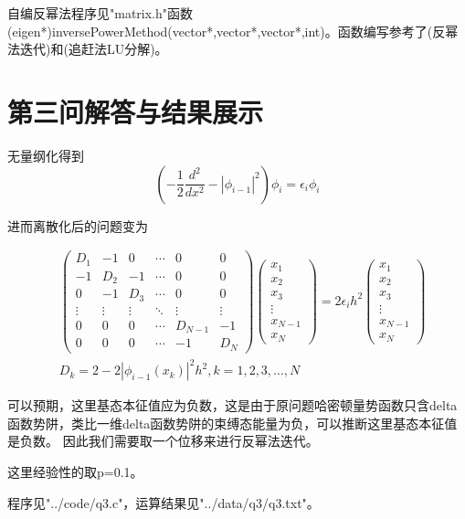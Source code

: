 \documentclass[10pt, a4paper]{article}
\begin{document}
    自编反幂法程序见"matrix.h"函数(eigen*)inversePowerMethod(vector*,vector*,vector*,int)。函数编写参考了\cite{ref1}(反幂法迭代)和\cite{ref2}(追赶法LU分解)。


    \section{第三问解答与结果展示}

    无量纲化得到
    \[(-\frac{1}{2}\frac{d^2}{dx^2}-|\phi_{i-1}|^2)\phi_i=\epsilon_i \phi_i\]

    进而离散化后的问题变为

    \begin{align*}
      &\begin{pmatrix}
        D_1&-1&0&\cdots&0&0\\
        -1& D_2&-1&\cdots&0&0\\
        0&-1&D_3&\cdots&0&0\\
        \vdots&\vdots&\vdots&\ddots&\vdots&\vdots\\
        0&0&0&\cdots& D_{N-1}&-1\\
        0&0&0&\cdots&-1&D_N
      \end{pmatrix}
      \begin{pmatrix}
        x_1\\
        x_2\\
        x_3\\
        \vdots\\
        x_{N-1}\\
        x_N
      \end{pmatrix}=
      2\epsilon_ih^2
      \begin{pmatrix}
        x_1\\
        x_2\\
        x_3\\
        \vdots\\
        x_{N-1}\\
        x_N
      \end{pmatrix}\\
      &D_k=2-2|\phi_{i-1}(x_k)|^2h^2,k=1,2,3,...,N
    \end{align*}

    可以预期，这里基态本征值应为负数，这是由于原问题哈密顿量势函数只含delta函数势阱，类比一维delta函数势阱的束缚态能量为负，可以推断这里基态本征值是负数。
    因此我们需要取一个位移来进行反幂法迭代。

    这里经验性的取p=0.1。

    程序见"../code/q3.c"，运算结果见"../data/q3/q3.txt"。
\end{document}
